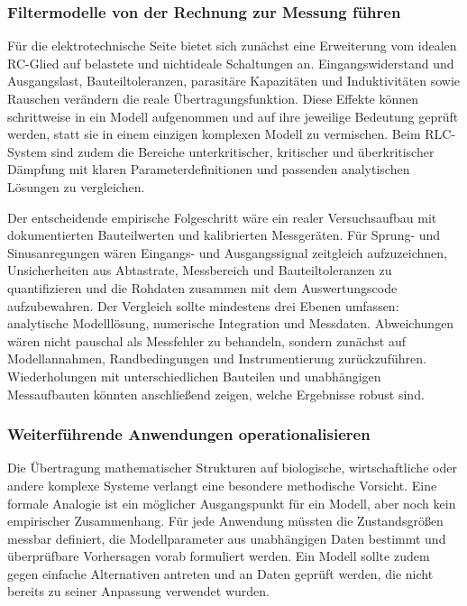 \documentclass[a4paper,12pt,twoside]{report}
\theoremstyle{definition}
\begin{document}
\subsubsection{Filtermodelle von der Rechnung zur Messung führen}

Für die elektrotechnische Seite bietet sich zunächst eine Erweiterung vom idealen RC-Glied auf belastete und nichtideale Schaltungen an. Eingangswiderstand und Ausgangslast, Bauteiltoleranzen, parasitäre Kapazitäten und Induktivitäten sowie Rauschen verändern die reale Übertragungsfunktion. Diese Effekte können schrittweise in ein Modell aufgenommen und auf ihre jeweilige Bedeutung geprüft werden, statt sie in einem einzigen komplexen Modell zu vermischen. Beim RLC-System sind zudem die Bereiche unterkritischer, kritischer und überkritischer Dämpfung mit klaren Parameterdefinitionen und passenden analytischen Lösungen zu vergleichen.

Der entscheidende empirische Folgeschritt wäre ein realer Versuchsaufbau mit dokumentierten Bauteilwerten und kalibrierten Messgeräten. Für Sprung- und Sinusanregungen wären Eingangs- und Ausgangssignal zeitgleich aufzuzeichnen, Unsicherheiten aus Abtastrate, Messbereich und Bauteiltoleranzen zu quantifizieren und die Rohdaten zusammen mit dem Auswertungscode aufzubewahren. Der Vergleich sollte mindestens drei Ebenen umfassen: analytische Modelllösung, numerische Integration und Messdaten. Abweichungen wären nicht pauschal als Messfehler zu behandeln, sondern zunächst auf Modellannahmen, Randbedingungen und Instrumentierung zurückzuführen. Wiederholungen mit unterschiedlichen Bauteilen und unabhängigen Messaufbauten könnten anschließend zeigen, welche Ergebnisse robust sind.

\subsubsection{Weiterführende Anwendungen operationalisieren}

Die Übertragung mathematischer Strukturen auf biologische, wirtschaftliche oder andere komplexe Systeme verlangt eine besondere methodische Vorsicht. Eine formale Analogie ist ein möglicher Ausgangspunkt für ein Modell, aber noch kein empirischer Zusammenhang. Für jede Anwendung müssten die Zustandsgrößen messbar definiert, die Modellparameter aus unabhängigen Daten bestimmt und überprüfbare Vorhersagen vorab formuliert werden. Ein Modell sollte zudem gegen einfache Alternativen antreten und an Daten geprüft werden, die nicht bereits zu seiner Anpassung verwendet wurden.
\end{document}
